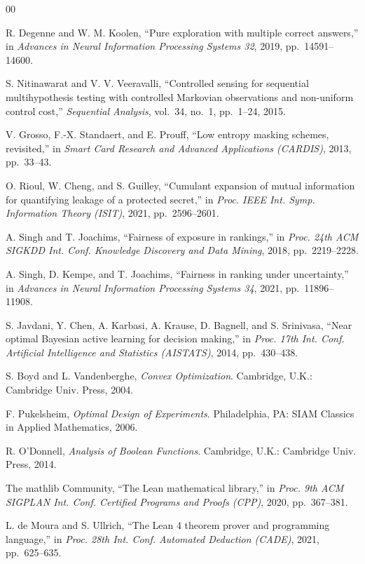 \begin{thebibliography}{00}

 R. Degenne and W. M. Koolen, ``Pure exploration with multiple correct
answers,'' in \emph{Advances in Neural Information Processing Systems 32}, 2019,
pp.~14591--14600.

 S. Nitinawarat and V. V. Veeravalli, ``Controlled sensing for
sequential multihypothesis testing with controlled Markovian observations and non-uniform
control cost,'' \emph{Sequential Analysis}, vol.~34, no.~1, pp.~1--24, 2015.

 V. Grosso, F.-X. Standaert, and E. Prouff, ``Low entropy masking
schemes, revisited,'' in \emph{Smart Card Research and Advanced Applications (CARDIS)},
2013, pp.~33--43.

 O. Rioul, W. Cheng, and S. Guilley, ``Cumulant expansion of mutual
information for quantifying leakage of a protected secret,'' in \emph{Proc. IEEE Int. Symp.
Information Theory (ISIT)}, 2021, pp.~2596--2601.

 A. Singh and T. Joachims, ``Fairness of exposure in rankings,'' in
\emph{Proc. 24th ACM SIGKDD Int. Conf. Knowledge Discovery and Data Mining}, 2018,
pp.~2219--2228.

 A. Singh, D. Kempe, and T. Joachims, ``Fairness in ranking under
uncertainty,'' in \emph{Advances in Neural Information Processing Systems 34}, 2021,
pp.~11896--11908.

 S. Javdani, Y. Chen, A. Karbasi, A. Krause, D. Bagnell, and
S. Srinivasa, ``Near optimal Bayesian active learning for decision making,'' in
\emph{Proc. 17th Int. Conf. Artificial Intelligence and Statistics (AISTATS)}, 2014,
pp.~430--438.

 S. Boyd and L. Vandenberghe, \emph{Convex Optimization}. Cambridge,
U.K.: Cambridge Univ. Press, 2004.

 F. Pukelsheim, \emph{Optimal Design of Experiments}. Philadelphia,
PA: SIAM Classics in Applied Mathematics, 2006.

 R. O'Donnell, \emph{Analysis of Boolean Functions}. Cambridge,
U.K.: Cambridge Univ. Press, 2014.

 The mathlib Community, ``The Lean mathematical library,'' in
\emph{Proc. 9th ACM SIGPLAN Int. Conf. Certified Programs and Proofs (CPP)}, 2020,
pp.~367--381.

 L. de Moura and S. Ullrich, ``The Lean 4 theorem prover and
programming language,'' in \emph{Proc. 28th Int. Conf. Automated Deduction (CADE)}, 2021,
pp.~625--635.

\end{thebibliography}




